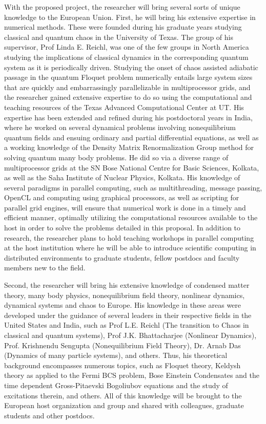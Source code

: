 \documentclass[a4paper,11pt]{article}
\begin{document}
With the proposed project, the researcher will bring several sorts of unique knowledge to the European Union. First, he will bring his extensive expertise in numerical methods. These were founded during his graduate years studying classical and quantum chaos in the University of Texas. The group of his supervisor, Prof Linda E. Reichl, was one of the few groups in North America studying the implications of classical dynamics in the corresponding quantum system as it is periodically driven. Studying the onset of chaos assisted adiabatic passage in the quantum Floquet problem numerically entails large system sizes that are quickly and embarrassingly parallelizable in multiprocessor grids, and the researcher gained extensive expertise to do so using the computational and teaching resources of the Texas Advanced Computational Center at UT. His expertise has been extended and refined during his postdoctoral years in India, where he worked on several dynamical problems involving nonequilibrium quantum fields and 
ensuing ordinary and partial differential equations, as well as a working knowledge of the Density Matrix Renormalization Group method for solving quantum many body problems. He did so via a diverse range of multiprocessor grids at the SN Bose National Centre for Basic Sciences, Kolkata, as well as the Saha Institute of Nuclear Physics, Kolkata. His knowledge of several paradigms in parallel computing, such as multithreading, message passing, OpenCL and computing using graphical processors, as well as scripting for parallel grid engines, will ensure that numerical work is done in a timely and efficient manner, optimally utilizing the computational resources available to the host in order to solve the problems detailed in this proposal. In addition to research, the researcher plans to hold teaching workshops in parallel computing at the host institution where he will be able to introduce scientific computing in distributed environments to graduate students, fellow postdocs and faculty members new to the field.

Second, the researcher will bring his extensive knowledge of condensed matter theory, many body physics, nonequilibrium field theory, nonlinear dynamics, dynamical systems and chaos to Europe. His knowledge in these areas were developed under the guidance of several leaders in their respective fields in the United States and India, such as Prof L.E. Reichl (The transition to Chaos in classical and quantum systems), Prof J.K. Bhattacharjee (Nonlinear Dynamics), Prof. Krishnendu Sengupta (Nonequilibrium Field Theory), Dr. Arnab Das (Dynamics of many particle systems),  and others. Thus, his theoretical background encompasses numerous topics, such as  Floquet theory, Keldysh theory as applied to the Fermi BCS problem, Bose Einstein Condensates and the time dependent Gross-Pitaevski Bogoliubov equations and the study of excitations therein, and others. All of this knowledge will be brought to the European host organization and group and shared with colleagues, graduate 
students and other postdocs.
\end{document}
